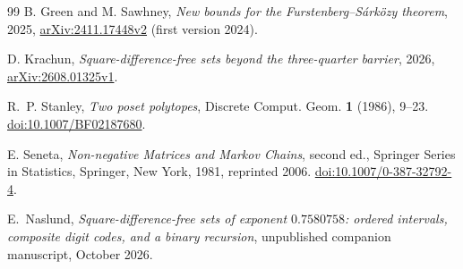 \documentclass[11pt]{article}
\theoremstyle{definition}
\theoremstyle{remark}
\begin{document}
\begin{thebibliography}{99}
B. Green and M. Sawhney,
\emph{New bounds for the Furstenberg--S\'ark\"ozy theorem},
2025, \href{https://arxiv.org/abs/2411.17448v2}{arXiv:2411.17448v2}
(first version 2024).

D. Krachun,
\emph{Square-difference-free sets beyond the three-quarter barrier},
2026, \href{https://arxiv.org/abs/2608.01325v1}{arXiv:2608.01325v1}.

R.~P. Stanley,
\emph{Two poset polytopes},
Discrete Comput. Geom. \textbf{1} (1986), 9--23.
\href{https://doi.org/10.1007/BF02187680}{doi:10.1007/BF02187680}.


E. Seneta,
\emph{Non-negative Matrices and Markov Chains}, second ed.,
Springer Series in Statistics, Springer, New York, 1981,
reprinted 2006.
\href{https://doi.org/10.1007/0-387-32792-4}{doi:10.1007/0-387-32792-4}.


E.~Naslund,
\emph{Square-difference-free sets of exponent $0.7580758$: ordered
intervals, composite digit codes, and a binary recursion},
unpublished companion manuscript, October 2026.

\end{thebibliography}

\endgroup
\end{document}
